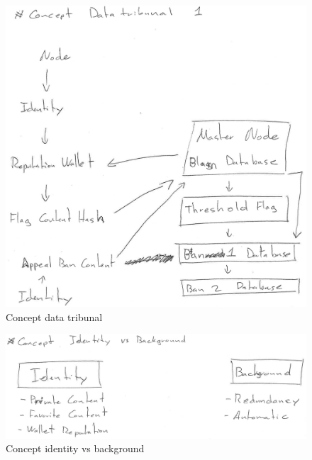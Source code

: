 \begin{figure}[htpb]
\centering
\begin{adjustbox}{center}
\includegraphics[scale=0.8]{annexes/concepts/oc-concept-data-tribunal.png}
\end{adjustbox}
\caption{Concept data tribunal
\label{fig:oc-concept-data-tribunal}} 
\end{figure}

\begin{figure}[htpb]
\centering
\begin{adjustbox}{center}
\includegraphics[scale=0.8]{annexes/concepts/oc-concept-identity-vs-background.png}
\end{adjustbox}
\caption{Concept identity vs background
\label{fig:oc-concept-identity-vs-background}} 
\end{figure}

